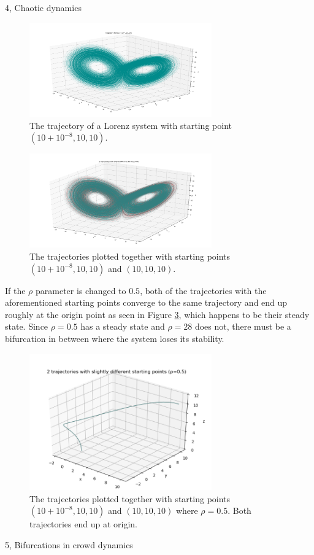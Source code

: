 \documentclass[10pt,a4paper]{article}
\begin{document}
\begin{task}{4, Chaotic dynamics}
\begin{figure}[H]
    \centering
    \includegraphics[width=0.7\textwidth]{../plots/lorenz_2.png}
    \caption{The trajectory of a Lorenz system with starting point $(10+10^{-8}, 10, 10)$.}
    \label{fig:lorenz_2}
\end{figure}

\begin{figure}[H]
    \centering
    \includegraphics[width=0.7\textwidth]{../plots/lorenz_3.png}
    \caption{The trajectories plotted together with starting points $(10+10^{-8}, 10, 10)$ and $(10, 10, 10)$.}
    \label{fig:lorenz_3}
\end{figure}

If the $\rho$ parameter is changed to $0.5$, both of the trajectories with the aforementioned starting points converge to the same trajectory and end up roughly at the origin point as seen in Figure \ref{fig:lorenz_4}, which happens to be their steady state. Since $\rho=0.5$ has a steady state and $\rho=28$ does not, there must be a bifurcation in between where the system loses its stability. \\

\begin{figure}[H]
    \centering
    \includegraphics[width=0.7\textwidth]{../plots/lorenz_4.png}
    \caption{The trajectories plotted together with starting points $(10+10^{-8}, 10, 10)$ and $(10, 10, 10)$ where $\rho=0.5$. Both trajectories end up at origin.}
    \label{fig:lorenz_4}
\end{figure}

\end{task}
\begin{task}{5, Bifurcations in crowd dynamics}

\end{task}
\end{document}
